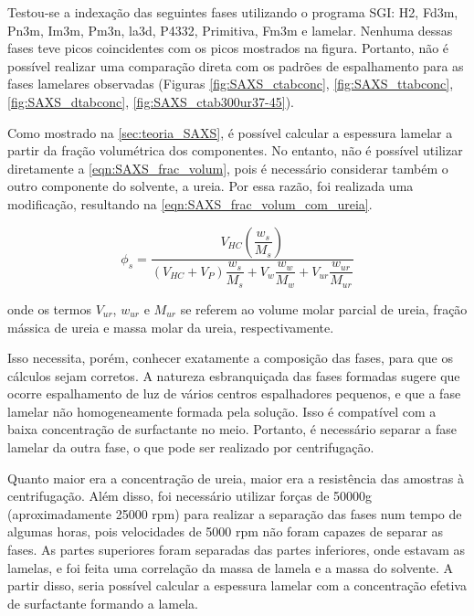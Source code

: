 	Testou-se a indexação das seguintes fases utilizando o programa SGI: H2, Fd3m, Pn3m, Im3m, Pm3n, la3d, P4332, Primitiva, Fm3m e lamelar. Nenhuma dessas fases teve picos coincidentes com os picos mostrados na figura. Portanto, não é possível realizar uma comparação direta com os padrões de espalhamento para as fases lamelares observadas (Figuras \ref{fig:SAXS_ctabconc}, \ref{fig:SAXS_ttabconc}, \ref{fig:SAXS_dtabconc}, \ref{fig:SAXS_ctab300ur37-45}).
	
	Como mostrado na \autoref{sec:teoria_SAXS}, é possível calcular a espessura lamelar a partir da fração volumétrica dos componentes. No entanto, não é possível utilizar diretamente a \autoref{eqn:SAXS_frac_volum}, pois é necessário considerar também o outro componente do solvente, a ureia. Por essa razão, foi realizada uma modificação, resultando na \autoref{eqn:SAXS_frac_volum_com_ureia}.
	
	\begin{equation}
		\phi_s = \dfrac{V_{\textit{HC}}\left( \dfrac{w_{s}}{M_{s}} \right)}{\left( V_{\textit{HC}} + V_{P} \right)\dfrac{w_{s}}{M_{s}} + V_{w}\dfrac{w_{w}}{M_{w}} + V_{\textit{ur}}\dfrac{w_{\textit{ur}}}{M_{\textit{ur}}}}
		\label{eqn:SAXS_frac_volum_com_ureia}
	\end{equation}  %

	\noindent onde os termos \(V_{\textit{ur}}\), \(w_{\textit{ur}}\) e \(M_{\textit{ur}}\)	se referem ao volume molar parcial de ureia, fração mássica de ureia e massa molar da ureia, respectivamente.
	
	Isso necessita, porém, conhecer exatamente a composição das fases, para que os cálculos sejam corretos.	A natureza esbranquiçada das fases formadas sugere que ocorre espalhamento de luz de vários centros espalhadores pequenos, e que a fase lamelar não homogeneamente formada pela solução. Isso é compatível com a baixa concentração de surfactante no meio. Portanto, é necessário separar a fase lamelar da outra fase, o que pode ser realizado por centrifugação.
	
	                   
	Quanto maior era a concentração de ureia, maior era a resistência das amostras à centrifugação. Além disso, foi necessário utilizar forças de 50000g (aproximadamente 25000 rpm) para realizar a separação das fases num tempo de algumas horas, pois velocidades de 5000 rpm não foram capazes de separar as fases. As partes superiores foram separadas das partes inferiores, onde estavam as lamelas, e foi feita uma correlação da massa de lamela e a massa do solvente. A partir disso, seria possível calcular a espessura lamelar com a concentração efetiva de surfactante formando a lamela.
	
